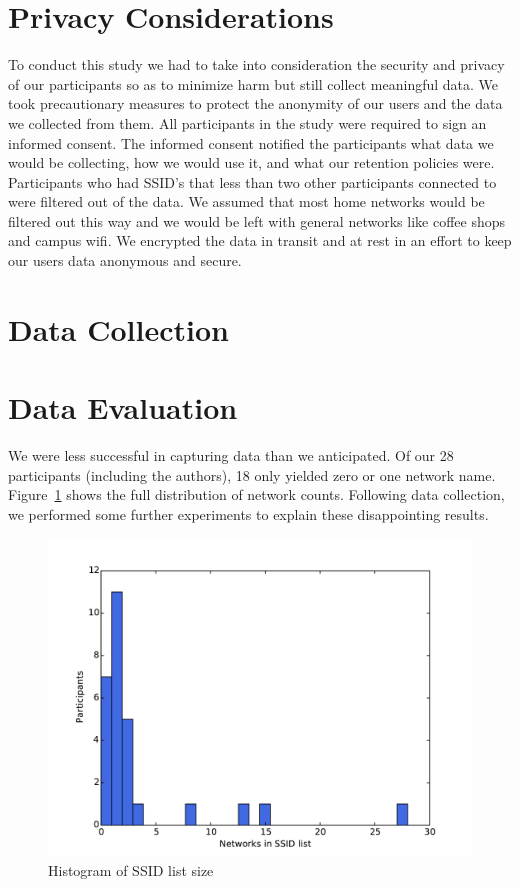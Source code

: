 \documentclass[letterpaper,twocolumn,10pt]{article}
\begin{document}
\section{Privacy Considerations}
To conduct this study we had to take into consideration the security and privacy of our participants so as to minimize harm but still collect meaningful data. We took precautionary measures to protect the anonymity of our users and the data we collected from them. 
All participants in the study were required to sign an informed consent. The informed consent notified the participants what data we would be collecting, how we would use it, and what our retention policies were. 
Participants who had SSID's that less than two other participants connected to were filtered out of the data. We assumed that most home networks would be filtered out this way and we would be left with general networks like coffee shops and campus wifi. We encrypted the data in transit and at rest in an effort to keep our users data anonymous and secure.


\section{Data Collection}


\section{Data Evaluation}
We were less successful in capturing data than we anticipated. Of our 28 participants (including the authors), 18 only yielded zero or one network name. Figure~\ref{histogram} shows the full distribution of network counts. Following data collection, we performed some further experiments to explain these disappointing results.

\begin{figure}
\includegraphics[width=\columnwidth]{hist.pdf}
\caption{Histogram of SSID list size}
\label{histogram}
\end{figure}
\end{document}
